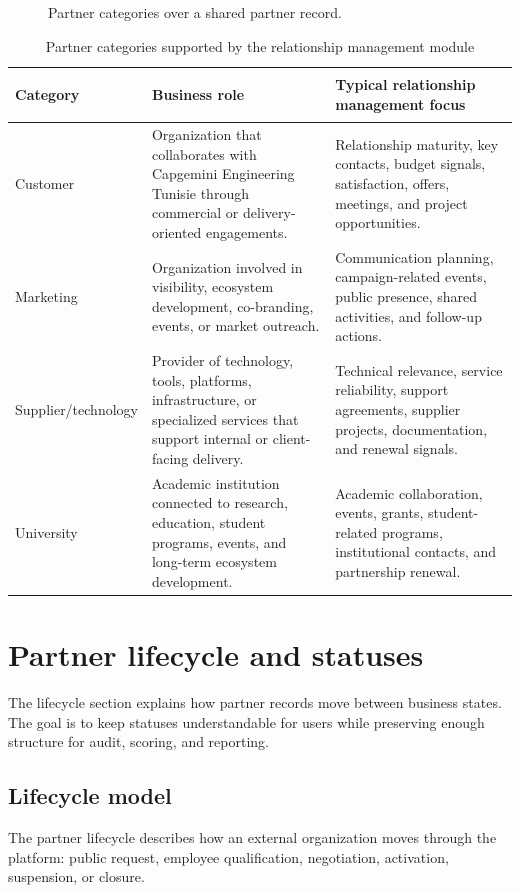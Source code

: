 \begin{figure}[htbp]
  \centering
  \caption{Partner categories over a shared partner record.}
  \label{fig:partner-categories}
\end{figure}

\begin{table}[H]
  \centering
  \caption{Partner categories supported by the relationship management module}
  \begin{tabularx}{\textwidth}{>{\bfseries\raggedright\arraybackslash}p{3cm}X X}
    \toprule
    Category & Business role & Typical relationship management focus \\
    \midrule
    Customer & Organization that collaborates with Capgemini Engineering Tunisie through commercial or delivery-oriented engagements. & Relationship maturity, key contacts, budget signals, satisfaction, offers, meetings, and project opportunities. \\
    Marketing & Organization involved in visibility, ecosystem development, co-branding, events, or market outreach. & Communication planning, campaign-related events, public presence, shared activities, and follow-up actions. \\
    Supplier/\allowbreak technology & Provider of technology, tools, platforms, infrastructure, or specialized services that support internal or client-facing delivery. & Technical relevance, service reliability, support agreements, supplier projects, documentation, and renewal signals. \\
    University & Academic institution connected to research, education, student programs, events, and long-term ecosystem development. & Academic collaboration, events, grants, student-related programs, institutional contacts, and partnership renewal. \\
    \bottomrule
  \end{tabularx}
\end{table}

\section{Partner lifecycle and statuses}
The lifecycle section explains how partner records move between business states. The goal is to keep statuses understandable for users while preserving enough structure for audit, scoring, and reporting.

\subsection{Lifecycle model}
The partner lifecycle describes how an external organization moves through the platform: public request, employee qualification, negotiation, activation, suspension, or closure.

